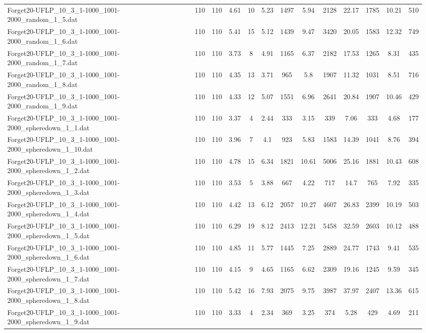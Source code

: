 \begin{table}[!ht]
{\begin{tabular}{lcccccccccccc}
Forget20-UFLP\_10\_3\_1-1000\_1001-2000\_random\_1\_5.dat & 110 & 110 & 4.61 & 10 & 5.23 & 1497 & 5.94 & 2128 & 22.17 & 1785 & 10.21 & 510 \\
Forget20-UFLP\_10\_3\_1-1000\_1001-2000\_random\_1\_6.dat & 110 & 110 & 5.41 & 15 & 5.12 & 1439 & 9.47 & 3420 & 20.05 & 1583 & 12.32 & 749 \\
Forget20-UFLP\_10\_3\_1-1000\_1001-2000\_random\_1\_7.dat & 110 & 110 & 3.73 & 8 & 4.91 & 1165 & 6.37 & 2182 & 17.53 & 1265 & 8.31 & 435 \\
Forget20-UFLP\_10\_3\_1-1000\_1001-2000\_random\_1\_8.dat & 110 & 110 & 4.35 & 13 & 3.71 & 965 & 5.8 & 1907 & 11.32 & 1031 & 8.51 & 716 \\
Forget20-UFLP\_10\_3\_1-1000\_1001-2000\_random\_1\_9.dat & 110 & 110 & 4.33 & 12 & 5.07 & 1551 & 6.96 & 2641 & 20.84 & 1907 & 10.46 & 429 \\
Forget20-UFLP\_10\_3\_1-1000\_1001-2000\_spheredown\_1\_1.dat & 110 & 110 & 3.37 & 4 & 2.44 & 333 & 3.15 & 339 & 7.06 & 333 & 4.68 & 177 \\
Forget20-UFLP\_10\_3\_1-1000\_1001-2000\_spheredown\_1\_10.dat & 110 & 110 & 3.96 & 7 & 4.1 & 923 & 5.83 & 1583 & 14.39 & 1041 & 8.76 & 394 \\
Forget20-UFLP\_10\_3\_1-1000\_1001-2000\_spheredown\_1\_2.dat & 110 & 110 & 4.78 & 15 & 6.34 & 1821 & 10.61 & 5006 & 25.16 & 1881 & 10.43 & 608 \\
Forget20-UFLP\_10\_3\_1-1000\_1001-2000\_spheredown\_1\_3.dat & 110 & 110 & 3.53 & 5 & 3.88 & 667 & 4.22 & 717 & 14.7 & 765 & 7.92 & 335 \\
Forget20-UFLP\_10\_3\_1-1000\_1001-2000\_spheredown\_1\_4.dat & 110 & 110 & 4.42 & 13 & 6.12 & 2057 & 10.27 & 4607 & 26.83 & 2399 & 10.19 & 503 \\
Forget20-UFLP\_10\_3\_1-1000\_1001-2000\_spheredown\_1\_5.dat & 110 & 110 & 6.29 & 19 & 8.12 & 2413 & 12.21 & 5458 & 32.59 & 2603 & 10.12 & 488 \\
Forget20-UFLP\_10\_3\_1-1000\_1001-2000\_spheredown\_1\_6.dat & 110 & 110 & 4.85 & 11 & 5.77 & 1445 & 7.25 & 2889 & 24.77 & 1743 & 9.41 & 535 \\
Forget20-UFLP\_10\_3\_1-1000\_1001-2000\_spheredown\_1\_7.dat & 110 & 110 & 4.15 & 9 & 4.65 & 1165 & 6.62 & 2309 & 19.16 & 1245 & 9.59 & 345 \\
Forget20-UFLP\_10\_3\_1-1000\_1001-2000\_spheredown\_1\_8.dat & 110 & 110 & 5.42 & 16 & 7.93 & 2075 & 9.75 & 3987 & 37.97 & 2407 & 13.36 & 615 \\
Forget20-UFLP\_10\_3\_1-1000\_1001-2000\_spheredown\_1\_9.dat & 110 & 110 & 3.33 & 4 & 2.34 & 369 & 3.25 & 374 & 5.28 & 429 & 4.69 & 211 \\

\end{tabular}}
\end{table}
